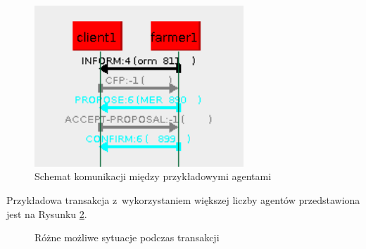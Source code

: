 \documentclass[12pt]{article}
\begin{document}
\begin{figure} [H]
 \centering
 \includegraphics[width=0.7\textwidth]{obrazki/komunikacja_2_agentow-accept}
 \caption{Schemat komunikacji między przykładowymi agentami}
 \label{fig:schemat komunikacji}
\end{figure}

Przykładowa transakcja z~wykorzystaniem większej liczby agentów przedstawiona jest na Rysunku \ref{fig:sytuacje w komunikacji}. 

\begin{figure} [H]
 \centering
    \hspace{20pt}
    \hspace{20pt}
 \caption{Różne możliwe sytuacje podczas transakcji}
 \label{fig:sytuacje w komunikacji}
\end{figure}
\end{document}
